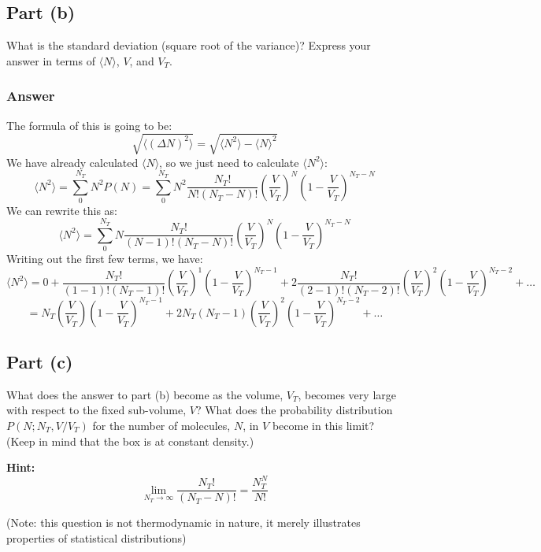 \documentclass{article}
\begin{document}
\subsection{Part (b)}
What is the standard deviation (square root of the variance)? Express your answer in terms of \( \langle N \rangle \), \( V \), and \( V_T \).
\subsubsection{Answer}
The formula of this is going to be:
\begin{equation}
    \sqrt{\langle (\Delta N)^2 \rangle} = \sqrt{\langle N^2 \rangle - \langle N \rangle^2}
\end{equation}
We have already calculated \( \langle N \rangle \), so we just need to calculate \( \langle N^2 \rangle \):
\begin{equation}
    \langle N^2 \rangle = \sum_{0}^{N_T} N^2 P(N) = \sum_{0}^{N_T} N^2 \frac{N_T!}{N!(N_T - N)!} \left(\frac{V}{V_T}\right)^N \left(1 - \frac{V}{V_T}\right)^{N_T - N}
\end{equation} 
We can rewrite this as:
\begin{equation}
    \langle N^2 \rangle = \sum_{0}^{N_T} N \frac{N_T!}{(N-1)!(N_T - N)!} \left(\frac{V}{V_T}\right)^N \left(1 - \frac{V}{V_T}\right)^{N_T - N}
\end{equation}
Writing out the first few terms, we have:
\begin{equation}
    \langle N^2 \rangle = 0 + \frac{N_T!}{(1-1)!(N_T - 1)!} \left(\frac{V}{V_T}\right)^1 \left(1 - \frac{V}{V_T}\right)^{N_T - 1} + 2 \frac{N_T!}{(2-1)!(N_T - 2)!} \left(\frac{V}{V_T}\right)^2 \left(1 - \frac{V}{V_T}\right)^{N_T - 2} + \ldots
\end{equation}
\begin{equation}
    = N_T \left(\frac{V}{V_T}\right) \left(1 - \frac{V}{V_T}\right)^{N_T - 1} + 2N_T(N_T-1) \left(\frac{V}{V_T}\right)^2 \left(1 - \frac{V}{V_T}\right)^{N_T - 2} + \ldots
\end{equation}

\subsection{Part (c)}
What does the answer to part (b) become as the volume, \( V_T \), becomes very large with respect to the fixed sub-volume, \( V \)? What does the probability distribution \( P(N; N_T, V/V_T) \) for the number of molecules, \( N \), in \( V \) become in this limit? (Keep in mind that the box is at constant density.)

\textbf{Hint:}
\[
\lim_{N_T \to \infty} \frac{N_T!}{(N_T - N)!} = \frac{N_T^N}{N!}
\]

(Note: this question is not thermodynamic in nature, it merely illustrates properties of statistical distributions)
\end{document}
